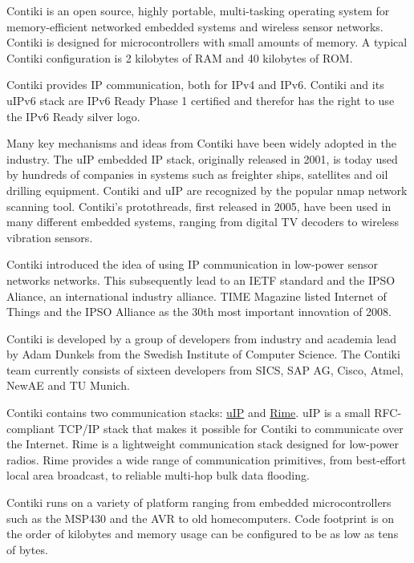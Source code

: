 \-Contiki is an open source, highly portable, multi-\/tasking operating system for memory-\/efficient networked embedded systems and wireless sensor networks. \-Contiki is designed for microcontrollers with small amounts of memory. \-A typical \-Contiki configuration is 2 kilobytes of \-R\-A\-M and 40 kilobytes of \-R\-O\-M.

\-Contiki provides \-I\-P communication, both for \-I\-Pv4 and \-I\-Pv6. \-Contiki and its u\-I\-Pv6 stack are \-I\-Pv6 \-Ready \-Phase 1 certified and therefor has the right to use the \-I\-Pv6 \-Ready silver logo.

\-Many key mechanisms and ideas from \-Contiki have been widely adopted in the industry. \-The u\-I\-P embedded \-I\-P stack, originally released in 2001, is today used by hundreds of companies in systems such as freighter ships, satellites and oil drilling equipment. \-Contiki and u\-I\-P are recognized by the popular nmap network scanning tool. \-Contiki's protothreads, first released in 2005, have been used in many different embedded systems, ranging from digital \-T\-V decoders to wireless vibration sensors.

\-Contiki introduced the idea of using \-I\-P communication in low-\/power sensor networks networks. \-This subsequently lead to an \-I\-E\-T\-F standard and the \-I\-P\-S\-O \-Aliance, an international industry alliance. \-T\-I\-M\-E \-Magazine listed \-Internet of \-Things and the \-I\-P\-S\-O \-Alliance as the 30th most important innovation of 2008.

\-Contiki is developed by a group of developers from industry and academia lead by \-Adam \-Dunkels from the \-Swedish \-Institute of \-Computer \-Science. \-The \-Contiki team currently consists of sixteen developers from \-S\-I\-C\-S, \-S\-A\-P \-A\-G, \-Cisco, \-Atmel, \-New\-A\-E and \-T\-U \-Munich.

\-Contiki contains two communication stacks\-: \hyperlink{a00060}{u\-I\-P} and \hyperlink{a00054}{\-Rime}. u\-I\-P is a small \-R\-F\-C-\/compliant \-T\-C\-P/\-I\-P stack that makes it possible for \-Contiki to communicate over the \-Internet. \-Rime is a lightweight communication stack designed for low-\/power radios. \-Rime provides a wide range of communication primitives, from best-\/effort local area broadcast, to reliable multi-\/hop bulk data flooding.

\-Contiki runs on a variety of platform ranging from embedded microcontrollers such as the \-M\-S\-P430 and the \-A\-V\-R to old homecomputers. \-Code footprint is on the order of kilobytes and memory usage can be configured to be as low as tens of bytes.

